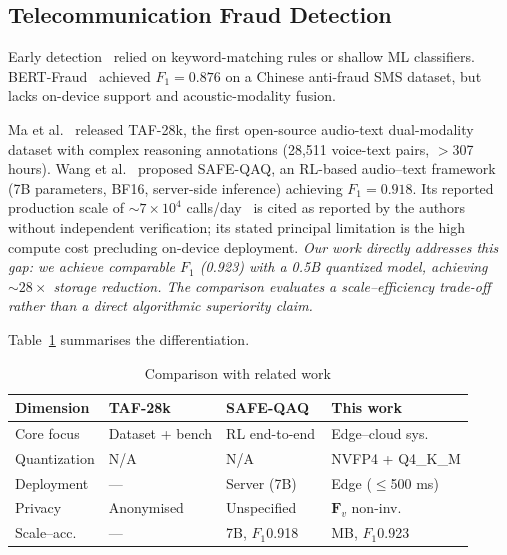 \documentclass[lettersize,journal]{IEEEtran}
\begin{document}
\subsection{Telecommunication Fraud Detection}

Early detection~\cite{13,14,15} relied on keyword-matching rules or
shallow ML classifiers.  BERT-Fraud~\cite{16} achieved $F_1 = 0.876$
on a Chinese anti-fraud SMS dataset, but lacks on-device support and
acoustic-modality fusion.

Ma et al.~\cite{1} released TAF-28k, the first open-source
audio-text dual-modality dataset with complex reasoning annotations
(28,511 voice-text pairs, $>$307 hours).  Wang et al.~\cite{2}
proposed SAFE-QAQ, an RL-based audio--text framework (7B parameters,
BF16, server-side inference) achieving $F_1 = 0.918$.  Its reported
production scale of ${\sim}7\!\times\!10^4$ calls/day~\cite{2} is
cited as reported by the authors without independent verification; its
stated principal limitation is the high compute cost precluding
on-device deployment.  \emph{Our work directly addresses this gap:
we achieve comparable $F_1$ (0.923) with a 0.5B quantized model,
achieving ${\sim}28\times$ storage reduction.  The comparison evaluates
a scale--efficiency trade-off rather than a direct algorithmic
superiority claim.}

Table~\ref{tab1} summarises the differentiation.

\begin{table}[htbp]
\caption{Comparison with related work}
\label{tab1}
\centering
\renewcommand{\arraystretch}{1.15}
\small
\setlength{\tabcolsep}{3pt}
\begin{tabular}{>{\raggedright\arraybackslash}p{1.5cm}%
                >{\raggedright\arraybackslash}p{1.75cm}%
                >{\raggedright\arraybackslash}p{1.75cm}%
                >{\raggedright\arraybackslash}p{1.9cm}}
\toprule
\textbf{Dimension} & \textbf{TAF-28k~\cite{1}} &
\textbf{SAFE-QAQ~\cite{2}} & \textbf{This work} \\
\midrule
Core focus     & Dataset + bench  & RL end-to-end    & Edge--cloud sys. \\
Quantization   & N/A              & N/A              & NVFP4 + Q4\_K\_M  \\
Deployment     & ---              & Server (7B)      & Edge ($\le$500 ms) \\
Privacy        & Anonymised       & Unspecified      & $\bm{F}_v$ non-inv. \\
Scale--acc.    & ---              & 7B, $F_1$0.918   & 248 MB, $F_1$0.923 \\
\bottomrule
\end{tabular}
\end{table}
\end{document}
